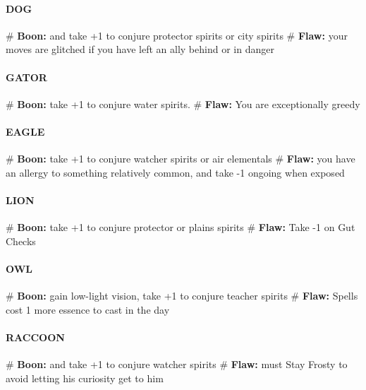 \paragraph{DOG}
    \begin{easylist}
        # \textbf{Boon:} and take +1 to conjure protector spirits or city spirits
        # \textbf{Flaw:} your moves are glitched if you have left an ally behind or in danger
    \end{easylist}

\paragraph{GATOR}
    \begin{easylist}
        # \textbf{Boon:} take +1 to conjure water spirits.
        # \textbf{Flaw:} You are exceptionally greedy
    \end{easylist}

\paragraph{EAGLE}
    \begin{easylist}
        # \textbf{Boon:} take +1 to conjure watcher spirits or air elementals
        # \textbf{Flaw:} you have an allergy to something relatively common, and take -1 ongoing when exposed
    \end{easylist}

\paragraph{LION}
    \begin{easylist}
        # \textbf{Boon:} take +1 to conjure protector or plains spirits
        # \textbf{Flaw:} Take -1 on Gut Checks
    \end{easylist}

\paragraph{OWL}
    \begin{easylist}
        # \textbf{Boon:} gain low-light vision, take +1 to conjure teacher spirits
        # \textbf{Flaw:} Spells cost 1 more essence to cast in the day
    \end{easylist}

\paragraph{RACCOON}
    \begin{easylist}
        # \textbf{Boon:} and take +1 to conjure watcher spirits
        # \textbf{Flaw:} must Stay Frosty to avoid letting his curiosity get to him
    \end{easylist}

